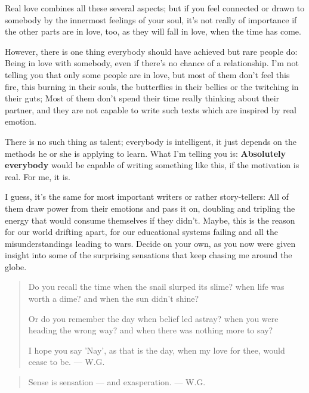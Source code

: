 Real love combines all these several aspects; but if you feel connected or drawn to somebody by the innermost feelings of your soul, it's not really of importance if the other parts are in love, too, as they will fall in love, when the time has come.

However, there is one thing everybody should have achieved but rare people do: Being in love with somebody, even if there's no chance of a relationship. 
I'm not telling you that only some people are in love, but most of them don't feel this fire, this burning in their souls, the butterflies in their bellies or the twitching in their guts; Most of them don't spend their time really thinking about their partner, and they are not capable to write such texts which are inspired by real emotion.

There is no such thing as talent; everybody is intelligent, it just depends on the methods he or she is applying to learn. 
What I'm telling you is: \textbf{Absolutely everybody} would be capable of writing something like this, if the motivation is real. 
For me, it is.

I guess, it's the same for most important writers or rather story-tellers: All of them draw power from their emotions and pass it on, doubling and tripling the energy that would consume themselves if they didn't. 
Maybe, this is the reason for our world drifting apart, for our educational systems failing and all the misunderstandings leading to wars. 
Decide on your own, as you now were given insight into some of the surprising sensations that keep chasing me around the globe. 

\begin{quote}
Do you recall the time
when the snail slurped its slime?
when life was worth a dime?
and when the sun didn't shine?

Or do you remember the day
when belief led astray?
when you were heading the wrong way?
and when there was nothing more to say?

I hope you say 'Nay',
as that is the day,
when my love for thee,
would cease to be. 
--- W.G.
\end{quote}

\begin{quote}
Sense is sensation --- and exasperation. 
--- W.G.
\end{quote}
